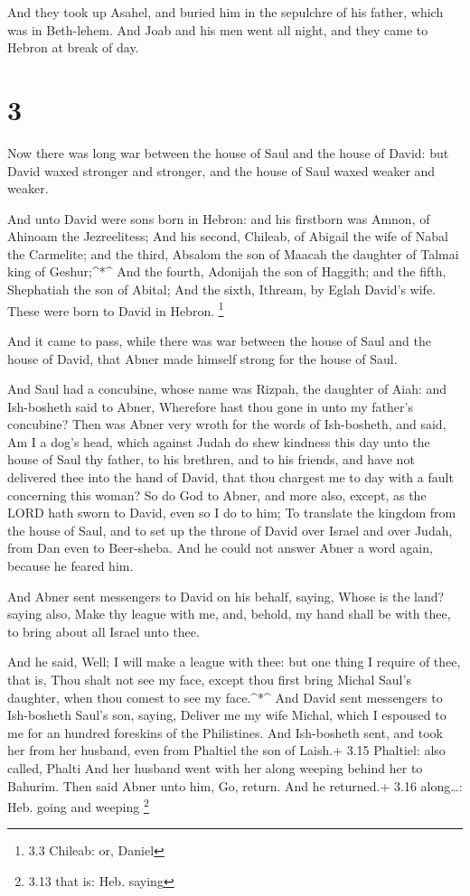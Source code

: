  And they took up Asahel, and buried him in the sepulchre
of his father, which was in Beth-lehem. And Joab and his men went all
night, and they came to Hebron at break of day.

\hypertarget{section-2}{%
\section{3}\label{section-2}}

 Now there was long war between the house of Saul and the
house of David: but David waxed stronger and stronger, and the house of
Saul waxed weaker and weaker.

 And unto David were sons born in Hebron: and his firstborn
was Amnon, of Ahinoam the Jezreelitess;  And his second,
Chileab, of Abigail the wife of Nabal the Carmelite; and the third,
Absalom the son of Maacah the daughter of Talmai king of
Geshur;\^{}*\^{}  And the fourth, Adonijah the son of
Haggith; and the fifth, Shephatiah the son of Abital;  And
the sixth, Ithream, by Eglah David's wife. These were born to David in
Hebron. \footnote{3.3 Chileab: or, Daniel}

 And it came to pass, while there was war between the house
of Saul and the house of David, that Abner made himself strong for the
house of Saul.

 And Saul had a concubine, whose name was Rizpah, the
daughter of Aiah: and Ish-bosheth said to Abner, Wherefore hast thou
gone in unto my father's concubine?  Then was Abner very
wroth for the words of Ish-bosheth, and said, Am I a dog's head, which
against Judah do shew kindness this day unto the house of Saul thy
father, to his brethren, and to his friends, and have not delivered thee
into the hand of David, that thou chargest me to day with a fault
concerning this woman?  So do God to Abner, and more also,
except, as the LORD hath sworn to David, even so I do to him;
 To translate the kingdom from the house of Saul, and to
set up the throne of David over Israel and over Judah, from Dan even to
Beer-sheba.  And he could not answer Abner a word again,
because he feared him.

 And Abner sent messengers to David on his behalf, saying,
Whose is the land? saying also, Make thy league with me, and, behold, my
hand shall be with thee, to bring about all Israel unto thee.

 And he said, Well; I will make a league with thee: but one
thing I require of thee, that is, Thou shalt not see my face, except
thou first bring Michal Saul's daughter, when thou comest to see my
face.\^{}*\^{}  And David sent messengers to Ish-bosheth
Saul's son, saying, Deliver me my wife Michal, which I espoused to me
for an hundred foreskins of the Philistines.  And
Ish-bosheth sent, and took her from her husband, even from Phaltiel the
son of Laish.+ 3.15 Phaltiel: also called, Phalti  And her
husband went with her along weeping behind her to Bahurim. Then said
Abner unto him, Go, return. And he returned.+ 3.16 along\ldots: Heb.
going and weeping \footnote{3.13 that is: Heb. saying}


